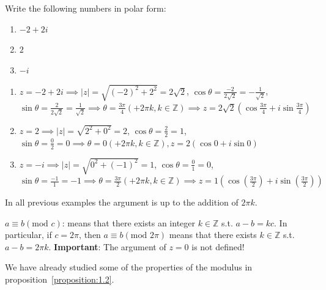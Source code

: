 \begin{example}
 Write the following numbers in polar form:
 \begin{enumerate}[label=(\alph*)]
    \item $-2+2i$ 
    \item $2$ 
    \item $-i$
\end{enumerate}
    \begin{soln}
\begin{enumerate}[label=\alph*)]
    \item $z=-2+2i \implies \lvert z\rvert = \sqrt{(-2)^2+2^2} = 2\sqrt{2}$, $\cos\theta = \frac{-2}{2\sqrt{2}} = -\frac{1}{\sqrt{2}}$, $\sin\theta = \frac{2}{2\sqrt{2}} = \frac{1}{\sqrt{2}} \implies \theta = \frac{3\pi}{4}(+2\pi k, k\in \mathbb{Z}) \implies z = 2\sqrt{2}(\cos\frac{3\pi}{4}+i\sin\frac{3\pi}{4})$
    \item $z=2 \implies \lvert z\rvert = \sqrt{2^2+0^2} = 2$, $\cos \theta = \frac{2}{2} = 1$, $\sin\theta = \frac{0}{2} = 0 \implies \theta = 0(+2\pi k, k\in \mathbb{Z}), z=2(\cos 0 + i\sin 0)$
    \item $z=-i \implies \lvert z\rvert = \sqrt{0^2+(-1)^2} = 1$, $\cos\theta = \frac{0}{1} = 0$, $\sin\theta = \frac{-1}{1}=-1 \implies \theta = \frac{3\pi}{2}(+2\pi k, k\in \mathbb{Z}) \implies z = 1(\cos(\frac{3\pi}{2})+i\sin(\frac{3\pi}{2}))$
\end{enumerate}
    \end{soln}
\end{example}

 In all previous examples the argument is up to the addition of $2\pi k$.
 \begin{remark}
$a \equiv b(\text{mod } c)$: means that there exists an integer $k\in\mathbb{Z}$ s.t. $a-b=kc$.
In particular, if $c=2\pi$, then $a\equiv b(\text{mod } 2\pi)$ means that there exists $k \in \mathbb{Z}$ s.t. $a-b=2\pi k$.
\textbf{Important}: The argument of $z=0$ is not defined!
 \end{remark}
We have already studied some of the properties of the modulus in proposition~\ref{proposition:1.2}.

